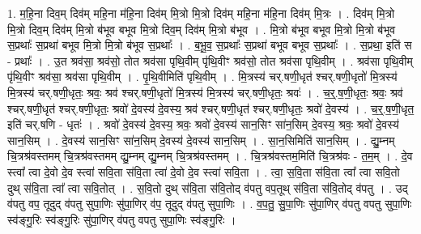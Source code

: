 \documentclass[17pt]{extarticle}
\begin{document}
1. म॒हि॒ना दिव॒म् दिव॑म् महि॒ना म॑हि॒ना दिव॑म् मि॒त्रो मि॒त्रो दिव॑म् महि॒ना म॑हि॒ना दिव॑म् मि॒त्रः । . दिव॑म् मि॒त्रो मि॒त्रो दिव॒म् दिव॑म् मि॒त्रो ब॑भूव बभूव मि॒त्रो दिव॒म् दिव॑म् मि॒त्रो ब॑भूव । . मि॒त्रो ब॑भूव बभूव मि॒त्रो मि॒त्रो ब॑भूव स॒प्रथाः᳚ स॒प्रथा॑ बभूव मि॒त्रो मि॒त्रो ब॑भूव स॒प्रथाः᳚ । . ब॒भू॒व॒ स॒प्रथाः᳚ स॒प्रथा॑ बभूव बभूव स॒प्रथाः᳚ । . स॒प्रथा॒ इति॑ स - प्रथाः᳚ । . उ॒त श्रव॑सा॒ श्रव॑सो॒ तोत श्रव॑सा पृथि॒वीम् पृ॑थि॒वीꣳ श्रव॑सो॒ तोत श्रव॑सा पृथि॒वीम् । . श्रव॑सा पृथि॒वीम् पृ॑थि॒वीꣳ श्रव॑सा॒ श्रव॑सा पृथि॒वीम् । . पृ॒थि॒वीमिति॑ पृथि॒वीम् । . मि॒त्रस्य॑ चर्.षणी॒धृत॑ श्चर्.षणी॒धृतो॑ मि॒त्रस्य॑ मि॒त्रस्य॑ चर्.षणी॒धृतः॒ श्रवः॒ श्रव॑ श्चर्.षणी॒धृतो॑ मि॒त्रस्य॑ मि॒त्रस्य॑ चर्.षणी॒धृतः॒ श्रवः॑ । . च॒र्॒.ष॒णी॒धृतः॒ श्रवः॒ श्रव॑ श्चर्.षणी॒धृत॑ श्चर्.षणी॒धृतः॒ श्रवो॑ दे॒वस्य॑ दे॒वस्य॒ श्रव॑ श्चर्.षणी॒धृत॑ श्चर्.षणी॒धृतः॒ श्रवो॑ दे॒वस्य॑ । . च॒र्॒.ष॒णी॒धृत॒ इति॑ चर्.षणि - धृतः॑ । . श्रवो॑ दे॒वस्य॑ दे॒वस्य॒ श्रवः॒ श्रवो॑ दे॒वस्य॑ सान॒सिꣳ सा॑न॒सिम् दे॒वस्य॒ श्रवः॒ श्रवो॑ दे॒वस्य॑ सान॒सिम् । . दे॒वस्य॑ सान॒सिꣳ सा॑न॒सिम् दे॒वस्य॑ दे॒वस्य॑ सान॒सिम् । . सा॒न॒सिमिति॑ सान॒सिम् । . द्यु॒म्नम् चि॒त्रश्र॑वस्तमम् चि॒त्रश्र॑वस्तमम् द्यु॒म्नम् द्यु॒म्नम् चि॒त्रश्र॑वस्तमम् । . चि॒त्रश्र॑वस्तम॒मिति॑ चि॒त्रश्र॑वः - त॒म॒म् । . दे॒व स्त्वा᳚ त्वा दे॒वो दे॒व स्त्वा॑ सवि॒ता स॑वि॒ता त्वा॑ दे॒वो दे॒व स्त्वा॑ सवि॒ता । . त्वा॒ स॒वि॒ता स॑वि॒ता त्वा᳚ त्वा सवि॒तो दुथ् स॑वि॒ता त्वा᳚ त्वा सवि॒तोत् । . स॒वि॒तो दुथ् स॑वि॒ता स॑वि॒तोद् व॑पतु वप॒तूथ् स॑वि॒ता स॑वि॒तोद् व॑पतु । . उद् व॑पतु वप॒ तूदुद् व॑पतु सुपा॒णिः सु॑पा॒णिर् व॑प॒ तूदुद् व॑पतु सुपा॒णिः । . व॒प॒तु॒ सु॒पा॒णिः सु॑पा॒णिर् व॑पतु वपतु सुपा॒णिः स्व॑ङ्गु॒रिः स्व॑ङ्गु॒रिः सु॑पा॒णिर् व॑पतु वपतु सुपा॒णिः स्व॑ङ्गु॒रिः । \newline
\end{document}
